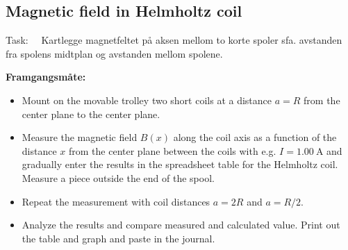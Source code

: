 \documentclass[../Elmag-labhefte-2020.tex]{subfiles}
\begin{document}
\subsection{Magnetic field in Helmholtz coil}

Task: \ \
{\itsf Kartlegge magnetfeltet på aksen mellom to korte spoler sfa. avstanden fra spolens midtplan og avstanden mellom spolene.}
 
\textbf{Framgangsmåte:}
\vspace{-5mm}
\begin{itemize}
    \item Mount on the movable trolley two short coils at a distance $a = R$ from the center plane to the center plane.
    \item Measure the magnetic field $B(x)$ along the coil axis as a function of the distance $x$ from the center plane between the coils with e.g. $I = \SI{1,00}{\ampere}$ and gradually enter the results in the spreadsheet table for the Helmholtz coil. Measure a piece outside the end of the spool.
    \item Repeat the measurement with coil distances $a = 2R$ and $a = R/2$.
    \item Analyze the results and compare measured and calculated value. Print out the table and graph and paste in the journal.
\end{itemize}
\end{document}
